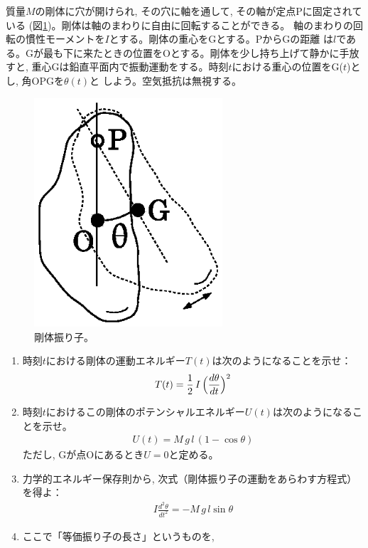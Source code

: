 \begin{q}
\begin{q}\label{q:mominert_pandulum}
質量$M$の剛体に穴が開けられ, その穴に軸を通して, その軸が定点Pに固定されている
(図\ref{fig:solid_pendulum})。剛体は軸のまわりに自由に回転することができる。
軸のまわりの回転の慣性モーメントを$I$とする。剛体の重心をGとする。PからGの距離
は$l$である。Gが最も下に来たときの位置をOとする。剛体を少し持ち上げて静かに手放すと, 
重心Gは鉛直平面内で振動運動をする。時刻$t$における重心の位置をG($t$)とし, 角OPGを$\theta(t)$と
しよう。空気抵抗は無視する。
\begin{figure}[h]
    \centering
    \includegraphics[width=7cm]{solid_pendulum.eps}
    \caption{剛体振り子。}\label{fig:solid_pendulum}
\end{figure}
\begin{enumerate}
\item 時刻$t$における剛体の運動エネルギー$T(t)$は次のようになることを示せ：
\begin{eqnarray}T(t)=\frac{1}{2}\,I\,\Bigl(\frac{d\theta}{dt}\Bigr)^2\end{eqnarray}
\item 時刻$t$におけるこの剛体のポテンシャルエネルギー$U(t)$は次のようになることを示せ。
\begin{eqnarray}U(t)=M\,g\,l\,(1-\cos \theta)\end{eqnarray}
ただし, Gが点Oにあるとき$U=0$と定める。
\item 力学的エネルギー保存則から, 次式（剛体振り子の運動をあらわす方程式）を得よ：
\begin{eqnarray}
I\frac{d^2\theta}{dt^2}=-M\,g\,l\sin\theta\label{q:mominert_pandulum5}
\end{eqnarray}
\item ここで「等価振り子の長さ」というものを, 

\end{enumerate}
\end{q}
\end{q}
